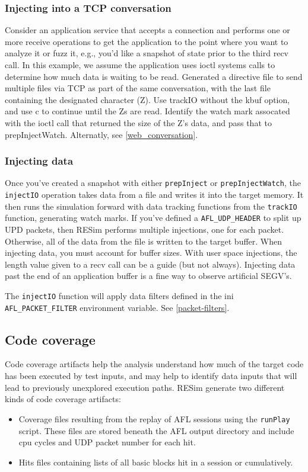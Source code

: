 \documentclass[titlepage]{article}
\begin{document}
\subsubsection{Injecting into a TCP conversation}
Consider an application service that accepts a connection and performs one or more receive operations to get the application to the point where
you want to analyze it or fuzz it, e.g., you'd like a snapshot of state prior to the third recv call.  In this example, we assume the application 
uses ioctl systems calls to determine how much data is waiting to be read.  Generated a directive file to send multiple files via
TCP as part of the same conversation, with the last file containing the designated character (Z).  Use trackIO without the kbuf option, and
use c to continue until the Zs are read.  Identify the watch mark assocated with the ioctl call that returned the size of the Z's data,
and pass that to prepInjectWatch.  Alternatly, see \ref{web_conversation}.

\subsubsection{Injecting data}
\label{injecting-data}
Once you've created a snapshot with either {\tt prepInject} or {\tt prepInjectWatch}, the {\tt injectIO} operation takes data from a file and writes it into the 
target memory. It then runs the simulation forward with data tracking functions from the {\tt trackIO} function, generating watch marks.  
If you've defined a {\tt AFL\_UDP\_HEADER} to split up
UPD packets, then RESim performs multiple injections, one for each packet.  Otherwise, all of the data from the file is written to the target buffer.
When injecting data, you must account for buffer sizes.  With user space injections, the length value
given to a recv call can be a guide (but not always).  Injecting data past the end of an application buffer is a fine way to observe artificial SEGV's.

The {\tt injectIO} function will apply data filters defined in the ini {\tt AFL\_PACKET\_FILTER} environment variable.  See \ref{packet-filters}.

\subsection{Code coverage}
\label{coverage}
Code coverage artifacts help the analysis understand how much of the target code has been executed by test inputs, and may help to identify data inputs
that will lead to previously unexplored execution paths.
RESim generate two different kinds of code coverage artifacts:
\begin{itemize}
\item Coverage files resulting from the replay of AFL sessions using the {\tt runPlay} script.  These files are stored beneath the AFL output directory
and include cpu cycles and UDP packet number for each hit. 
\item Hits files containing lists of all basic blocks hit in a session or cumulatively.
\end{itemize}
\end{document}
